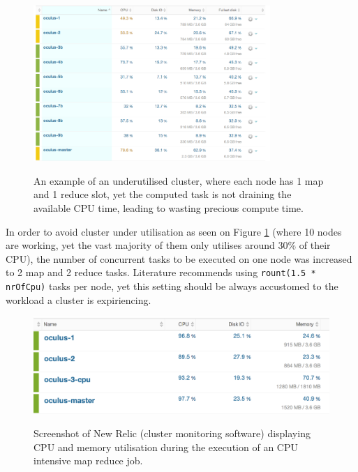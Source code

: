 \begin{figure}[ch!]
  \centering
  \includegraphics[width=0.8\textwidth]{img/hadoop/10nodes-newrelic-suffering-from-no-data-locallity}
  \label{fig:ten-under-utilised-cluster}
  \caption{An example of an underutilised cluster, where each node has 1 map and 1 reduce slot, yet the computed task is not draining the available CPU time, leading to wasting precious compute time.}
\end{figure}

In order to avoid cluster under utilisation as seen on Figure \ref{fig:ten-under-utilised-cluster} (where 10 nodes are working, yet the vast majority of them only utilises around 30\% of their CPU), the number of concurrent tasks to be executed on one node was increased to 2 map and 2 reduce tasks. Literature recommends using \verb|rount(1.5 * nrOfCpu)| tasks per node, yet this setting should be always accustomed to the workload a cluster is expiriencing.

\begin{figure}[ch!]
  \centering
  \includegraphics[width=\textwidth]{img/hadoop/monitoring-during-processing}
  \label{fig:cpu-load-during-job}
  \caption{Screenshot of New Relic (cluster monitoring software) displaying CPU and memory utilisation during the execution of an CPU intensive map reduce job.}
\end{figure}


